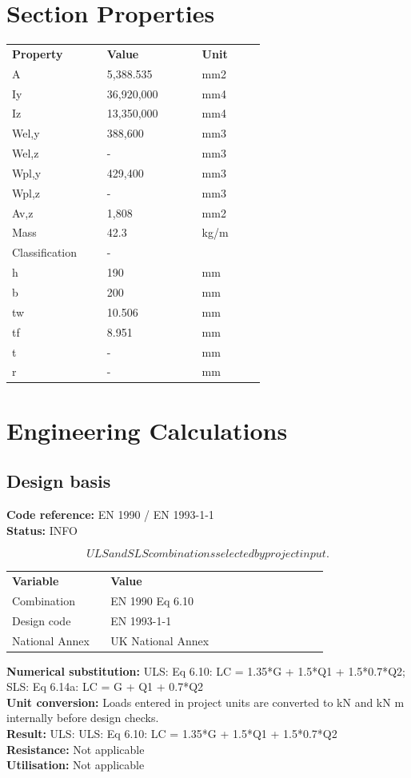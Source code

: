\documentclass[11pt,a4paper]{article}
\begin{document}
\section{Section Properties}
\begin{longtable}{p{0.30\linewidth}p{0.30\linewidth}p{0.20\linewidth}}
\textbf{Property} & \textbf{Value} & \textbf{Unit} \\
A & 5,388.535 & mm2 \\
Iy & 36,920,000 & mm4 \\
Iz & 13,350,000 & mm4 \\
Wel,y & 388,600 & mm3 \\
Wel,z & - & mm3 \\
Wpl,y & 429,400 & mm3 \\
Wpl,z & - & mm3 \\
Av,z & 1,808 & mm2 \\
Mass & 42.3 & kg/m \\
Classification & - &  \\
h & 190 & mm \\
b & 200 & mm \\
tw & 10.506 & mm \\
tf & 8.951 & mm \\
t & - & mm \\
r & - & mm \\
\end{longtable}

\section{Engineering Calculations}
\subsection{Design basis}
\textbf{Code reference:} EN 1990 / EN 1993-1-1\\
\textbf{Status:} INFO

\[
ULS and SLS combinations selected by project input.
\]

\begin{longtable}{p{0.28\linewidth}p{0.62\linewidth}}
\textbf{Variable} & \textbf{Value} \\
Combination & EN 1990 Eq 6.10 \\
Design code & EN 1993-1-1 \\
National Annex & UK National Annex \\
\end{longtable}

\textbf{Numerical substitution:} ULS: Eq 6.10: LC = 1.35*G + 1.5*Q1 + 1.5*0.7*Q2; SLS: Eq 6.14a: LC = G + Q1 + 0.7*Q2\\
\textbf{Unit conversion:} Loads entered in project units are converted to kN and kN m internally before design checks.\\
\textbf{Result:} ULS: ULS: Eq 6.10: LC = 1.35*G + 1.5*Q1 + 1.5*0.7*Q2\\
\textbf{Resistance:} Not applicable\\
\textbf{Utilisation:} Not applicable\\
\end{document}

